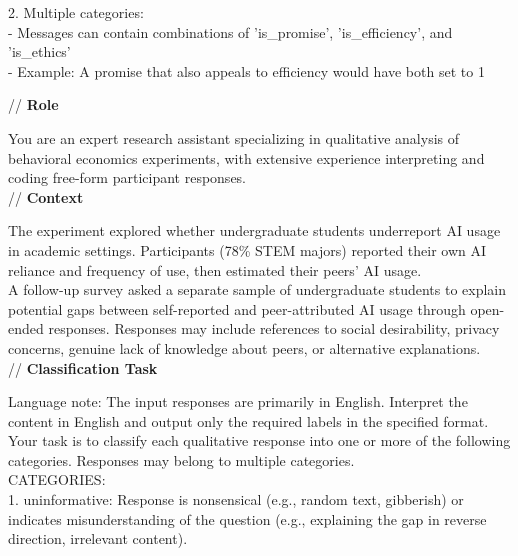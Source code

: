 \documentclass[11pt]{article}
\begin{document}
\begin{sloppypar}
\begin{appendices}
\begin{tcolorbox}
2. Multiple categories:\\
   - Messages can contain combinations of 'is\_promise', 'is\_efficiency', and 'is\_ethics'\\
   - Example: A promise that also appeals to efficiency would have both set to 1\\

\end{tcolorbox}


\begin{tcolorbox}[
    enhanced,
    breakable, %
    colback=white,
    colframe=black,
    sharp corners,
    boxrule=0.5pt,
    width=0.98\linewidth,
    center,
    fontupper=\ttfamily
]

// \textbf{Role}

You are an expert research assistant specializing in qualitative analysis of behavioral economics experiments, with extensive experience interpreting and coding free-form participant responses.  \\

// \textbf{Context}

The experiment explored whether undergraduate students underreport AI usage in academic settings. Participants (78\% STEM majors) reported their own AI reliance and frequency of use, then estimated their peers' AI usage.\\

A follow-up survey asked a separate sample of undergraduate students to explain potential gaps between self-reported and peer-attributed AI usage through open-ended responses. Responses may include references to social desirability, privacy concerns, genuine lack of knowledge about peers, or alternative explanations.\\


// \textbf{Classification Task}

Language note: The input responses are primarily in English. Interpret the content in English and output only the required labels in the specified format.\\

Your task is to classify each qualitative response into one or more of the following categories. Responses may belong to multiple categories.\\

CATEGORIES:\\

1. uninformative: Response is nonsensical (e.g., random text, gibberish) or indicates misunderstanding of the question (e.g., explaining the gap in reverse direction, irrelevant content).\\


\end{tcolorbox}
\end{appendices}
\end{sloppypar}
\end{document}
